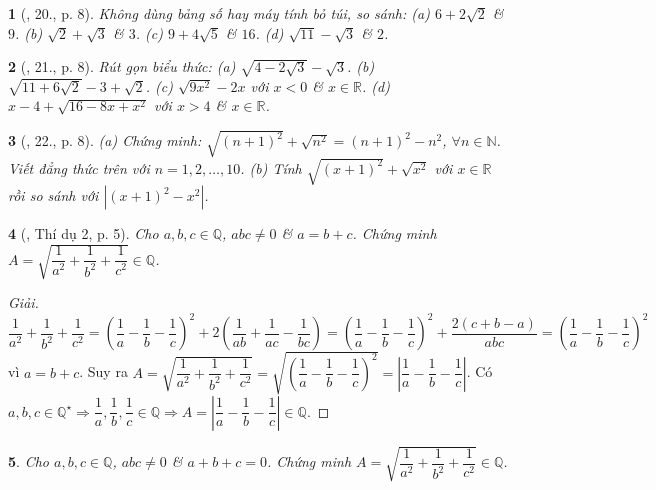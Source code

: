 \documentclass{article}
\newtheorem{baitoan}{}
\begin{document}
\begin{baitoan}[\cite{SBT_Toan_9_tap_1}, 20., p. 8]
	Không dùng bảng số hay máy tính bỏ túi, so sánh: (a) $6 + 2\sqrt{2}$ \& $9$. (b) $\sqrt{2} + \sqrt{3}$ \& $3$. (c) $9 + 4\sqrt{5}$ \& $16$. (d) $\sqrt{11} - \sqrt{3}$ \& $2$.
\end{baitoan}

\begin{baitoan}[\cite{SBT_Toan_9_tap_1}, 21., p. 8]
	Rút gọn biểu thức: (a) $\sqrt{4 - 2\sqrt{3}} - \sqrt{3}$. (b) $\sqrt{11 + 6\sqrt{2}} - 3 + \sqrt{2}$. (c) $\sqrt{9x^2} - 2x$ với $x < 0$ \& $x\in\mathbb{R}$. (d) $x - 4 + \sqrt{16 - 8x + x^2}$ với $x > 4$ \& $x\in\mathbb{R}$.
\end{baitoan}

\begin{baitoan}[\cite{SBT_Toan_9_tap_1}, 22., p. 8]
	(a) Chứng minh: $\sqrt{(n + 1)^2} + \sqrt{n^2} = (n + 1)^2 - n^2$, $\forall n\in\mathbb{N}$. Viết đẳng thức trên với $n = 1,2,\ldots,10$. (b) Tính $\sqrt{(x + 1)^2} + \sqrt{x^2}$ với $x\in\mathbb{R}$ rồi so sánh với $|(x + 1)^2 - x^2|$.
\end{baitoan}

\begin{baitoan}[\cite{Tuyen_Toan_9_old}, Thí dụ 2, p. 5]
	\label{prob: Tuyen_Toan_9 VD 2 p. 5}
	Cho $a,b,c\in\mathbb{Q}$, $abc\ne0$ \& $a = b + c$. Chứng minh $A = \sqrt{\dfrac{1}{a^2} + \dfrac{1}{b^2} + \dfrac{1}{c^2}}\in\mathbb{Q}$.
\end{baitoan}

\begin{proof}[Giải]
	$\dfrac{1}{a^2} + \dfrac{1}{b^2} + \dfrac{1}{c^2} = \left(\dfrac{1}{a} - \dfrac{1}{b} - \dfrac{1}{c}\right)^2 + 2\left(\dfrac{1}{ab} + \dfrac{1}{ac} - \dfrac{1}{bc}\right) = \left(\dfrac{1}{a} - \dfrac{1}{b} - \dfrac{1}{c}\right)^2 + \dfrac{2(c + b - a)}{abc} = \left(\dfrac{1}{a} - \dfrac{1}{b} - \dfrac{1}{c}\right)^2$ vì $a = b + c$. Suy ra $A = \sqrt{\dfrac{1}{a^2} + \dfrac{1}{b^2} + \dfrac{1}{c^2}} = \sqrt{\left(\dfrac{1}{a} - \dfrac{1}{b} - \dfrac{1}{c}\right)^2} = \left|\dfrac{1}{a} - \dfrac{1}{b} - \dfrac{1}{c}\right|$. Có $a,b,c\in\mathbb{Q}^\star\Rightarrow\dfrac{1}{a},\dfrac{1}{b},\dfrac{1}{c}\in\mathbb{Q}\Rightarrow A = \left|\dfrac{1}{a} - \dfrac{1}{b} - \dfrac{1}{c}\right|\in\mathbb{Q}$.
\end{proof}

\begin{baitoan}
	\label{prob: Mo rong Tuyen_Toan_9 VD 2 p. 5}
	Cho $a,b,c\in\mathbb{Q}$, $abc\ne0$ \& $a + b + c = 0$. Chứng minh $A = \sqrt{\dfrac{1}{a^2} + \dfrac{1}{b^2} + \dfrac{1}{c^2}}\in\mathbb{Q}$.
\end{baitoan}
\end{document}
